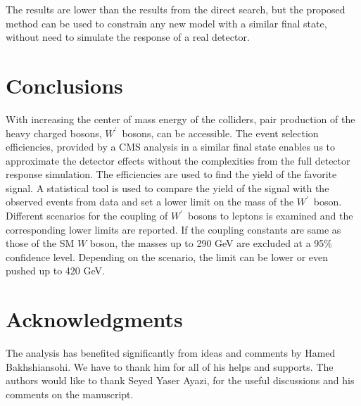 \documentclass[preprint,showpacs,preprintnumbers]{revtex4}
\newcommand{\wprime}{\ensuremath{W^\prime}~}
\begin{document}
The results are lower than the results from the direct search, but the proposed method can be used to constrain any new model with a similar final state, without need to simulate the response of a real detector.

\section{Conclusions}\label{sec:conclusion} 
With increasing the center of mass energy of the colliders, pair production of the heavy charged bosons, \wprime bosons, can be accessible. The event selection efficiencies, provided by a CMS analysis in a similar final state enables us to approximate the detector effects without the complexities from the full detector response simulation. The efficiencies are used to find the yield of the favorite signal. A statistical tool is used to compare the yield of the signal with the observed events from data and set a lower limit on the mass of the \wprime boson. Different 
scenarios for the coupling of \wprime bosons to leptons is examined and the corresponding lower limits are reported. If the coupling constants are same as those of the SM $W$ boson, the masses up to 290 GeV are excluded at a 95\% confidence level. Depending on the scenario, the limit can be lower or even pushed up to 420 GeV.


\section{Acknowledgments}
The analysis has benefited significantly from ideas and comments by Hamed Bakhshiansohi. We have to thank him for all of his helps and supports. 
The authors would like to thank Seyed Yaser Ayazi, for the useful discussions and 
his comments on the manuscript.
\end{document}
